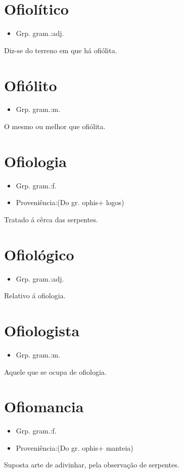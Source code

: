 \section{Ofiolítico}
\begin{itemize}
\item {Grp. gram.:adj.}
\end{itemize}
Diz-se do terreno em que há ofiólita.
\section{Ofiólito}
\begin{itemize}
\item {Grp. gram.:m.}
\end{itemize}
O mesmo ou melhor que \textunderscore ofiólita\textunderscore .
\section{Ofiologia}
\begin{itemize}
\item {Grp. gram.:f.}
\end{itemize}
\begin{itemize}
\item {Proveniência:(Do gr. \textunderscore ophis\textunderscore  + \textunderscore logos\textunderscore )}
\end{itemize}
Tratado á cêrca das serpentes.
\section{Ofiológico}
\begin{itemize}
\item {Grp. gram.:adj.}
\end{itemize}
Relativo á ofiologia.
\section{Ofiologista}
\begin{itemize}
\item {Grp. gram.:m.}
\end{itemize}
Aquele que se ocupa de ofiologia.
\section{Ofiomancia}
\begin{itemize}
\item {Grp. gram.:f.}
\end{itemize}
\begin{itemize}
\item {Proveniência:(Do gr. \textunderscore ophis\textunderscore  + \textunderscore manteia\textunderscore )}
\end{itemize}
Suposta arte de adivinhar, pela observação de serpentes.
